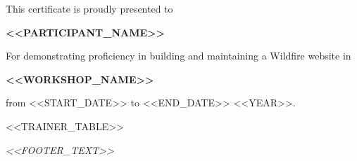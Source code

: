 \documentclass[a4paper, landscape]{article}
\begin{document}
\begin{center}
    \vspace{0.2in}

    This certificate is proudly presented to

    \vspace{0.45in}

    {\color{KalaamBlue} \fontsize{48pt}{50pt}\selectfont \textbf{<<PARTICIPANT_NAME>>}}

    \vspace{0.45in}

    For demonstrating proficiency in building and maintaining a Wildfire website in

    \vspace{0.25in}

    {\huge \textbf{<<WORKSHOP_NAME>>}}

    \vspace{0.2in}

    from <<START_DATE>> to <<END_DATE>> <<YEAR>>.

    \vspace{0.8in} %

    <<TRAINER_TABLE>>

    \vspace{0.2in}

    {\small \textit{<<FOOTER_TEXT>>}}

\end{center}
\end{document}
